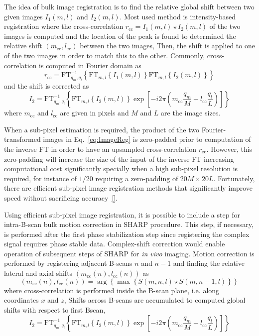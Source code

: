 The idea of bulk image registration is to find the relative global shift between two given images $I_1(m,l)$ and $I_2(m,l)$. Most used method is intensity-based registration where the cross-correlation $r_{\text{cc}} = I_1(m,l)\star I_2(m,l)$ of the two images is computed and the location of the peak is found to determined the relative shift $(m_{\text{cc}}, l_{\text{cc}})$ between the two images, Then, the shift is applied to one of the two images in order to match this to the other. Commonly, cross-correlation is computed in Fourier domain as 
\begin{equation}\label{eq:ImageReg}
    r_{\text{cc}} = \text{FT}^{-1}_{q_m,q_l}\left\{\text{FT}_{m,l}\left\{I_1(m,l)\right\}\text{FT}_{m,l}\left\{I_2(m,l)\right\}\right\}
\end{equation}
and the shift is corrected as
\begin{equation}
    I_2 = \text{FT}^{-1}_{q_m,q_l}\left\{\text{FT}_{m,l}\left\{I_2(m,l)\right\} \exp\left[-i2\pi\left(m_{\text{cc}} \frac{q_m}{M} + l_{\text{cc}} \frac{q_l}{L}\right)\right]\right\}
\end{equation}
where $m_{\text{cc}}$ and $l_{\text{cc}}$ are given in pixels and $M$ and $L$ are the image sizes.

When a sub-pixel estimation is required, the product of the two Fourier-transformed images in Eq.~\eqref{eq:ImageReg} is zero-padded prior to computation of the inverse FT in order to have an upsampled cross-correlation $r_{\text{cc}}$. However, this zero-padding will increase the size of the input of the inverse FT increasing computational cost significantly specially when a high sub-pixel resolution is required, for instance of $1/20$ requiring a zero-padding of $20M\times 20L$. Fortunately, there are efficient sub-pixel image registration methods that significantly improve speed without sacrificing accuracy~\ref{}.

Using efficient sub-pixel image registration, it is possible to include a step for intra-B-scan bulk motion correction in SHARP procedure. This step, if necessary, is performed after the first phase stabilization step since registering the complex signal requires phase stable data. Complex-shift correction would enable operation of subsequent steps of SHARP for \textit{in vivo} imaging. Motion correction is performed by registering adjacent B-scans $n$ and $n-1$ and finding the relative lateral and axial shifts $(m_\text{cc}(n), l_\text{cc}(n))$ as
\begin{equation}
    (m_\text{cc}(n), l_\text{cc}(n)) = \arg\left\{\max\left\{ S(m,n,l)\star S(m,n-1,l) \right\}\right\}
\end{equation}
where cross-correlation is performed inside the B-scan plane, i.e. along coordinates $x$ and $z$, Shifts across B-scans are accumulated to computed global shifts with respect to first Bscan,
\begin{equation}
    I_2 = \text{FT}^{-1}_{q_m,q_l}\left\{\text{FT}_{m,l}\left\{I_2(m,l)\right\} \exp\left[-i2\pi\left(m_{\text{cc}} \frac{q_m}{M} + l_{\text{cc}} \frac{q_l}{L}\right)\right]\right\}
\end{equation}

